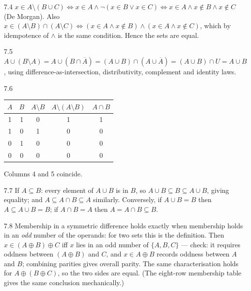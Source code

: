\begin{solution}{7.4}
$x \in A \setminus (B \cup C)
\iff x \in A \wedge \neg(x \in B \vee x \in C)
\iff x \in A \wedge x \notin B \wedge x \notin C$
(De Morgan). Also
$x \in (A \setminus B) \cap (A \setminus C)
\iff (x \in A \wedge x \notin B) \wedge (x \in A \wedge x \notin C)$,
which by idempotence of $\wedge$ is the same condition. Hence the sets are
equal.
\end{solution}

\begin{solution}{7.5}
$A \cup (B \setminus A)
= A \cup (B \cap \overline{A})
= (A \cup B) \cap (A \cup \overline{A})
= (A \cup B) \cap U = A \cup B$,
using difference-as-intersection, distributivity, complement and identity
laws.
\end{solution}

\begin{solution}{7.6}
\begin{center}
\begin{tabular}{cc|ccc}
\toprule
$A$&$B$&$A\setminus B$&$A\setminus(A\setminus B)$&$A\cap B$\\
\midrule
1&1&0&1&1\\
1&0&1&0&0\\
0&1&0&0&0\\
0&0&0&0&0\\
\bottomrule
\end{tabular}
\end{center}
Columns 4 and 5 coincide.
\end{solution}

\begin{solution}{7.7}
If $A \subseteq B$: every element of $A \cup B$ is in $B$, so
$A \cup B \subseteq B \subseteq A \cup B$, giving equality; and
$A \subseteq A \cap B \subseteq A$ similarly. Conversely, if $A \cup B = B$
then $A \subseteq A \cup B = B$; if $A \cap B = A$ then
$A = A \cap B \subseteq B$.
\end{solution}

\begin{solution}{7.8}
Membership in a symmetric difference holds exactly when membership holds in
an \emph{odd} number of the operands: for two sets this is the definition.
Then $x \in (A \oplus B) \oplus C$ iff $x$ lies in an odd number of
$\{A,B,C\}$ --- check: it requires oddness between $(A \oplus B)$ and $C$,
and $x \in A \oplus B$ records oddness between $A$ and $B$; combining
parities gives overall parity. The same characterisation holds for
$A \oplus (B \oplus C)$, so the two sides are equal. (The eight-row
membership table gives the same conclusion mechanically.)
\end{solution}

